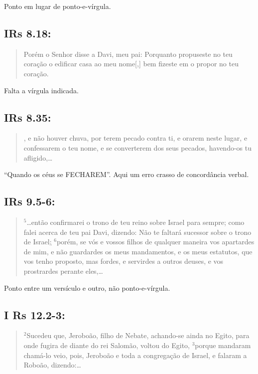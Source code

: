 Ponto em lugar de ponto-e-vírgula.

\subsection*{IRs 8.18:} 
\begin{quote}
    \small
Porém o Senhor disse a Davi, meu pai: Porquanto propuseste no teu coração o edificar casa ao meu nome[,] bem fizeste em o propor no teu coração.
\end{quote}

Falta a vírgula indicada.

\subsection*{IRs 8.35:} 
\begin{quote}
    \small
{}, e não houver chuva, por terem pecado contra ti, e orarem neste lugar, e confessarem o teu nome, e se converterem dos seus pecados, havendo-os tu afligido,\ldots
\end{quote}

``Quando os céus se FECHAREM''. Aqui um erro crasso de concordância verbal.

\subsection*{ IRs 9.5-6:} 
\begin{quote}
    \small
$^{\mathrm{5}}$\ldots então confirmarei o trono de teu reino sobre Israel para sempre; como falei acerca de teu pai Davi, dizendo: Não te faltará sucessor sobre o trono de Israel\uline{;} $^{\mathrm{6}}$porém, se vós e vossos filhos de qualquer maneira vos apartardes de mim, e não guardardes os meus mandamentos, e os meus estatutos, que vos tenho proposto, mas fordes, e servirdes a outros deuses, e vos prostrardes perante eles,\ldots
\end{quote}

Ponto entre um versículo e outro, não ponto-e-vírgula.

\subsection*{I Rs 12.2-3:} 
\begin{quote}
    \small
$^{\mathrm{2}}$Sucedeu que, Jeroboão, filho de Nebate, achando-se ainda no Egito, para onde fugira de diante do rei Salomão, voltou do Egito, $^{\mathrm{3}}$porque mandaram chamá-lo\uwave{;} veio, pois, Jeroboão e toda a congregação de Israel, e falaram a Roboão, dizendo:\ldots
\end{quote}

